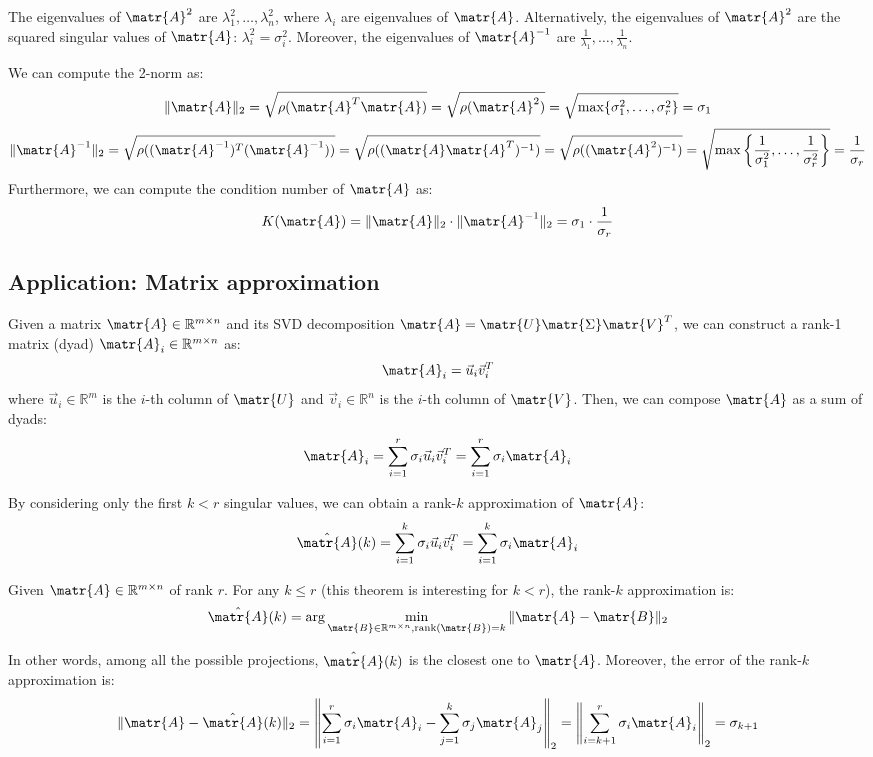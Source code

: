 The eigenvalues of $\matr{A}^2$ are $\lambda_1^2, \dots,\lambda_n^2$, where $\lambda_i$ are eigenvalues of $\matr{A}$.
Alternatively, the eigenvalues of $\matr{A}^2$ are the squared singular values of $\matr{A}$: $\lambda_i^2 = \sigma_i^2$.
Moreover, the eigenvalues of $\matr{A}^{-1}$ are $\frac{1}{\lambda_1}, \dots, \frac{1}{\lambda_n}$.

We can compute the 2-norm as:
\[ \Vert \matr{A} \Vert_2 = \sqrt{\rho(\matr{A}^T\matr{A})} = \sqrt{\rho(\matr{A}^2)} = \sqrt{\max\{\sigma_1^2, \dots, \sigma_r^2\}} = \sigma_1 \]
\[ 
    \Vert \matr{A}^{-1} \Vert_2 = \sqrt{\rho((\matr{A}^{-1})^T(\matr{A}^{-1}))} = 
    \sqrt{\rho((\matr{A}\matr{A}^T)^{-1})} = \sqrt{\rho((\matr{A}^2)^{-1})} = 
    \sqrt{\max \left\{\frac{1}{\sigma_1^2}, \dots, \frac{1}{\sigma_r^2} \right\}} = \frac{1}{\sigma_r}
\]
Furthermore, we can compute the condition number of $\matr{A}$ as:
\[ K(\matr{A}) = \Vert \matr{A} \Vert_2 \cdot \Vert \matr{A}^{-1} \Vert_2 = \sigma_1 \cdot \frac{1}{\sigma_r} \]



\subsection{Application: Matrix approximation}
Given a matrix $\matr{A} \in \mathbb{R}^{m \times n}$ and its SVD decomposition $\matr{A} = \matr{U}\matr{\Sigma}\matr{V}^T$,
we can construct a rank-1 matrix (dyad) $\matr{A}_i \in \mathbb{R}^{m \times n}$ as: 
\[ \matr{A}_i = \vec{u}_i \vec{v}_i^T \]
where $\vec{u}_i \in \mathbb{R}^m$ is the $i$-th column of $\matr{U}$ and
$\vec{v}_i \in \mathbb{R}^n$ is the $i$-th column of $\matr{V}$.
Then, we can compose $\matr{A}$ as a sum of dyads:
\[ \matr{A}_i = \sum_{i=1}^{r} \sigma_i \vec{u}_i \vec{v}_i^T = \sum_{i=1}^{r} \sigma_i \matr{A}_i \]

By considering only the first $k < r$ singular values, we can obtain a rank-$k$ approximation of $\matr{A}$:
\[ \hat{\matr{A}}(k) = \sum_{i=1}^{k} \sigma_i \vec{u}_i \vec{v}_i^T = \sum_{i=1}^{k} \sigma_i \matr{A}_i \]

\begin{theorem}
    Given $\matr{A} \in \mathbb{R}^{m \times n}$ of rank $r$.
    For any $k \leq r$ (this theorem is interesting for $k < r$), the rank-$k$ approximation is:
    \[ 
        \hat{\matr{A}}(k) = \arg \min_{\matr{B} \in \mathbb{R}^{m \times n}, \text{rank}(\matr{B}) = k} \Vert \matr{A} - \matr{B} \Vert_2 
    \]
\end{theorem}
In other words, among all the possible projections, $\hat{\matr{A}}(k)$ is the closest one to $\matr{A}$.
Moreover, the error of the rank-$k$ approximation is:
\[
    \Vert \matr{A} - \hat{\matr{A}}(k) \Vert_2 = 
        \left\Vert \sum_{i=1}^{r} \sigma_i \matr{A}_i - \sum_{j=1}^{k} \sigma_j \matr{A}_j \right\Vert_2 =
        \left\Vert \sum_{i=k+1}^{r} \sigma_i \matr{A}_i \right\Vert_2 = 
        \sigma_{k+1}
\]

